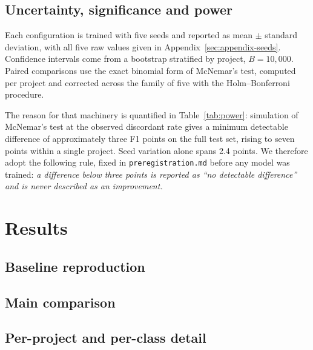 \documentclass[10pt,a4paper]{article}
\begin{document}
\subsection{Uncertainty, significance and power}
\label{sec:power}

Each configuration is trained with five seeds and reported as mean $\pm$
standard deviation, with all five raw values given in
Appendix~\ref{sec:appendix-seeds}. Confidence intervals come from a bootstrap
stratified by project, $B = 10{,}000$. Paired comparisons use the exact
binomial form of McNemar's test, computed per project and corrected across the
family of five with the Holm--Bonferroni procedure.

The reason for that machinery is quantified in
Table~\ref{tab:power}: simulation of McNemar's test at the observed discordant
rate gives a minimum detectable difference of approximately three F1 points on
the full test set, rising to seven points within a single project. Seed
variation alone spans 2.4 points. We therefore adopt the following rule, fixed
in \texttt{preregistration.md} before any model was trained: \emph{a difference
below three points is reported as ``no detectable difference'' and is never
described as an improvement.}



\section{Results}
\label{sec:results}

\subsection{Baseline reproduction}



\subsection{Main comparison}



\subsection{Per-project and per-class detail}


\end{document}
